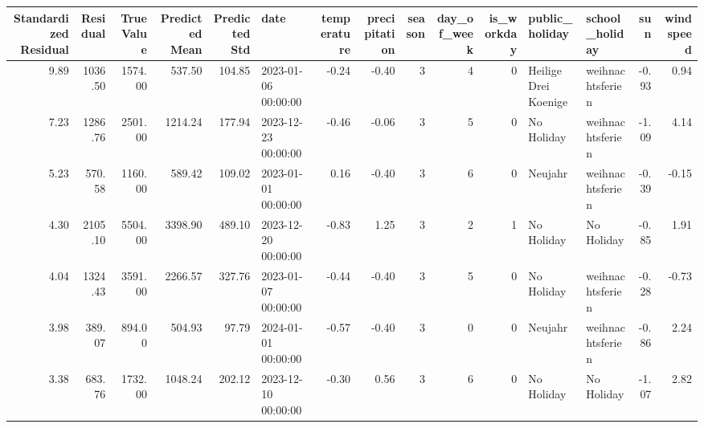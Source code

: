 \begin{tabular}{rrrrrlrrrrrllrr}
\toprule
Standardized Residual & Residual & True Value & Predicted Mean & Predicted Std & date & temperature & precipitation & season & day_of_week & is_workday & public_holiday & school_holiday & sun & windspeed \\
\midrule
9.89 & 1036.50 & 1574.00 & 537.50 & 104.85 & 2023-01-06 00:00:00 & -0.24 & -0.40 & 3 & 4 & 0 & Heilige Drei Koenige & weihnachtsferien & -0.93 & 0.94 \\
7.23 & 1286.76 & 2501.00 & 1214.24 & 177.94 & 2023-12-23 00:00:00 & -0.46 & -0.06 & 3 & 5 & 0 & No Holiday & weihnachtsferien & -1.09 & 4.14 \\
5.23 & 570.58 & 1160.00 & 589.42 & 109.02 & 2023-01-01 00:00:00 & 0.16 & -0.40 & 3 & 6 & 0 & Neujahr & weihnachtsferien & -0.39 & -0.15 \\
4.30 & 2105.10 & 5504.00 & 3398.90 & 489.10 & 2023-12-20 00:00:00 & -0.83 & 1.25 & 3 & 2 & 1 & No Holiday & No Holiday & -0.85 & 1.91 \\
4.04 & 1324.43 & 3591.00 & 2266.57 & 327.76 & 2023-01-07 00:00:00 & -0.44 & -0.40 & 3 & 5 & 0 & No Holiday & weihnachtsferien & -0.28 & -0.73 \\
3.98 & 389.07 & 894.00 & 504.93 & 97.79 & 2024-01-01 00:00:00 & -0.57 & -0.40 & 3 & 0 & 0 & Neujahr & weihnachtsferien & -0.86 & 2.24 \\
3.38 & 683.76 & 1732.00 & 1048.24 & 202.12 & 2023-12-10 00:00:00 & -0.30 & 0.56 & 3 & 6 & 0 & No Holiday & No Holiday & -1.07 & 2.82 \\
\bottomrule
\end{tabular}
